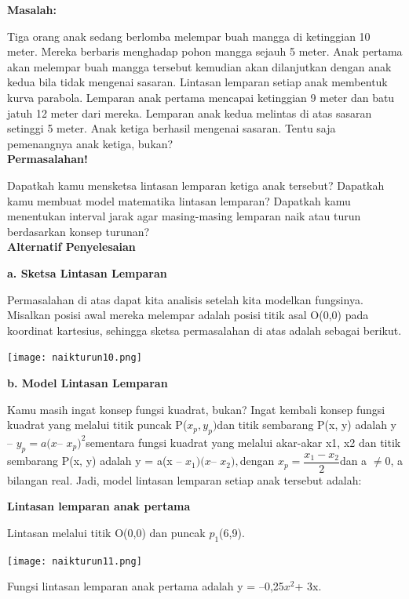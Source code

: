 \documentclass[11pt,fleqn]{book} %
\begin{document}
\textbf{Masalah:}

Tiga orang anak sedang berlomba melempar buah mangga di ketinggian 10 meter. Mereka berbaris menghadap pohon mangga sejauh 5 meter. Anak pertama akan melempar buah mangga tersebut kemudian akan dilanjutkan dengan anak kedua bila tidak mengenai sasaran. Lintasan lemparan setiap anak membentuk kurva parabola. Lemparan anak pertama mencapai ketinggian 9 meter dan batu jatuh 12 meter dari mereka. Lemparan anak kedua melintas di atas sasaran setinggi 5 meter. Anak ketiga berhasil mengenai sasaran. Tentu saja pemenangnya anak ketiga, bukan?
\\

\textbf{Permasalahan!}

Dapatkah kamu mensketsa lintasan lemparan ketiga anak tersebut? Dapatkah kamu membuat model matematika lintasan lemparan? Dapatkah kamu menentukan interval jarak agar masing-masing lemparan naik atau turun berdasarkan konsep turunan?\\


\textbf{Alternatif Penyelesaian}

\textbf{a. Sketsa Lintasan Lemparan}

Permasalahan di atas dapat kita analisis setelah kita modelkan fungsinya. Misalkan posisi awal mereka melempar adalah posisi titik asal O(0,0) pada koordinat kartesius, sehingga sketsa permasalahan di atas adalah sebagai berikut.

\begin{center}
\texttt{[image: naikturun10.png]}
\end{center}

\textbf{b. Model Lintasan Lemparan}

Kamu masih ingat konsep fungsi kuadrat, bukan? Ingat
kembali konsep fungsi kuadrat yang melalui titik puncak
P($x_{p}, y_{p}) $dan titik sembarang P(x, y) adalah y – $y_{p} = a(x
$– $x_{p})^2 $sementara fungsi kuadrat yang melalui akar-akar x1,
x2 dan titik sembarang P(x, y) adalah y = a(x – $x_{1})(x $– $x_{2}),
$dengan $x_{p}= \dfrac{x_{1}-x_{2}}{2}
$dan a $\neq $0, a bilangan real. Jadi, model
lintasan lemparan setiap anak tersebut adalah:

\textbf{Lintasan lemparan anak pertama}

Lintasan melalui titik O(0,0) dan puncak $p_{1}$(6,9).

\texttt{[image: naikturun11.png]}

Fungsi lintasan lemparan anak pertama adalah y = –0,25$x^{2} $+ 3x.\\
\end{document}
